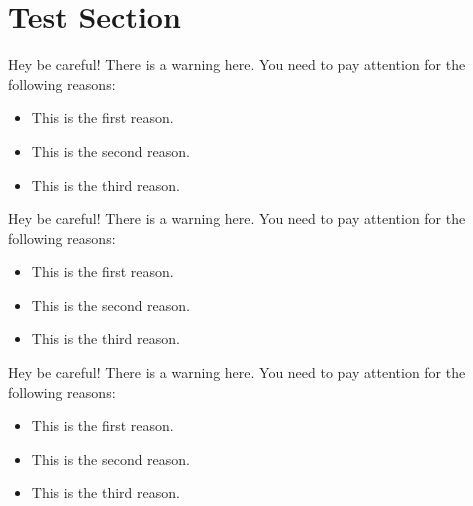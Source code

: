 \documentclass{article}
\begin{document}
\section{Test Section}

\blindtext

\begin{testwarning2}
Hey be careful!
There is a warning here. You need to pay attention for the following reasons:
\begin{itemize}
  \item This is the first reason.
  \item This is the second reason.
  \item This is the third reason.
\end{itemize}
\end{testwarning2}

\begin{testwarning2}
Hey be careful!
There is a warning here. You need to pay attention for the following reasons:
\begin{itemize}
  \item This is the first reason.
  \item This is the second reason.
  \item This is the third reason.
\end{itemize}
\end{testwarning2}

\begin{testwarning2}
Hey be careful!
There is a warning here. You need to pay attention for the following reasons:
\begin{itemize}
  \item This is the first reason.
  \item This is the second reason.
  \item This is the third reason.
\end{itemize}
\end{testwarning2}
\end{document}
